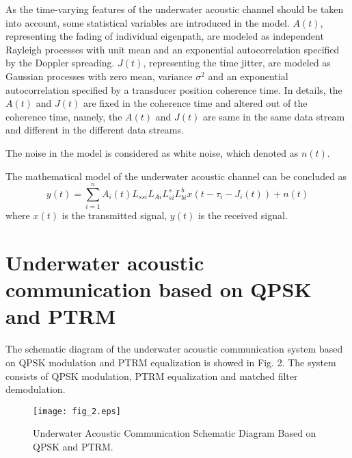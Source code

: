 \documentclass[journal]{IEEEtran}
\begin{document}
As the time-varying features of the underwater acoustic channel
should be taken into account, some statistical variables are
introduced in the model. $A(t)$, representing the fading of
individual eigenpath, are modeled as independent Rayleigh processes
with unit mean and an exponential autocorrelation specified by the
Doppler spreading. $J(t)$, representing the time jitter, are modeled
as Gaussian processes with zero mean, variance ${\sigma^2}$ and an
exponential autocorrelation specified by a transducer position
coherence time. In details, the $A(t)$ and $J(t)$ are fixed in the
coherence time and altered out of the coherence time, namely, the
$A(t)$ and $J(t)$ are same in the same data stream and different in
the different data streams.


The noise in the model is considered as white noise, which denoted
as $n(t)$.

The mathematical model of the underwater acoustic channel can be
concluded as
\begin{equation}
\label{eqn_example} y(t) = \sum\limits_{i = 1}^n
{{A_i}(t){L_{ssi}}{L_{Ai}}L_{si}^sL_{bi}^bx(t - {\tau _i} -
{J_i}(t))}  + n(t)
\end{equation}
where $x(t)$ is the transmitted signal, $y(t)$ is the received
signal.
\section{Underwater acoustic communication based on QPSK and PTRM}
The schematic diagram of the underwater acoustic communication
system based on QPSK modulation and PTRM equalization is showed in
Fig. 2. The system consists of QPSK modulation, PTRM equalization
and matched filter demodulation.
\begin{figure}[!t]
\centering
\texttt{[image: fig\_2.eps]}
\caption{Underwater Acoustic Communication Schematic Diagram Based
on QPSK and PTRM.} \label{fig_sim}
\end{figure}
\end{document}
